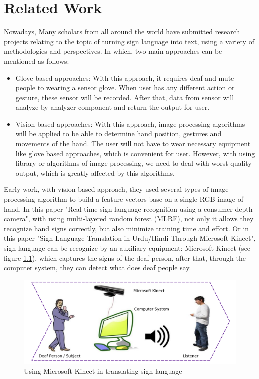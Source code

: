 \chapter{Related Work}
  Nowadays, Many scholars from all around the world have submitted research 
  projects relating to the topic of turning sign language into text, 
  using a variety of methodologies and perspectives.
  In which, two main approaches can be mentioned as follows:
  \begin{itemize}
    \item Glove based approaches:
    With this approach, it requires deaf and mute people to wearing a sensor glove. When user
    has any different action or gesture, these sensor will be recorded. After that, data from
    sensor will analyze by analyzer component and return the output for user.
    \item Vision based approaches:
    With this approach, image processing algorithms will be applied to be able to determine
    hand position, gestures and movements of the hand. The user will not have to wear necessary
    equipment like glove based approaches, which is convenient for user. However, with using
    library or algorithms of image processing, we need to deal with worst quality output, which is
    greatly affected by this algorithms.
  \end{itemize}

  Early work, with vision based approach, they used several types of
  image processing algorithm to build a feature vectors base on a single RGB image of hand.
  In this paper "Real-time sign language recognition using a consumer depth camera",
  with using multi-layered random forest (MLRF), not only it allows they recognize hand signs
  correctly, but also minimize training time and effort. Or in this paper "Sign Language Translation in Urdu/Hindi Through
  Microsoft Kinect", sign language can be recognize by an auxiliary equipment: Microsoft Kinect (see figure \ref{fig:Chap2-MS-Kinect}), which captures
  the signs of the deaf person, after that, through the computer system, they can detect what does deaf people say.

  \begin{figure}[H]
    \centering
    \includegraphics[width=\textwidth]{img/Chap2/MS-Kinect.png}
    \caption{Using Microsoft Kinect in translating sign language}
    \label{fig:Chap2-MS-Kinect}
  \end{figure}

